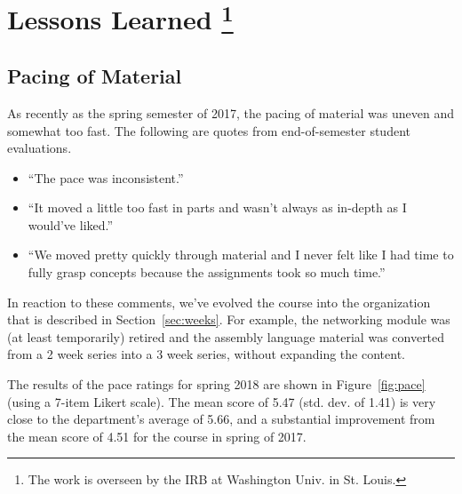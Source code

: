 \section{Lessons Learned%
\protect\footnote{The work is overseen by the IRB at Washington Univ. in St. Louis.}
}
\label{sec:lessons}


\subsection{Pacing of Material}


As recently as the spring semester of 2017, the pacing of material
was uneven and somewhat too fast.  The following are quotes from
end-of-semester student evaluations.
\begin{itemize}
\item ``The pace was inconsistent.''
\item ``It moved a little too fast in parts and wasn't always as
in-depth as I would've liked.''
\item ``We moved pretty quickly through material and I never felt like I had
time to fully grasp concepts because the assignments took so much time.''
\end{itemize}
In reaction to these comments, we've evolved the course into the organization
that is described in Section~\ref{sec:weeks}.
For example, the networking module was (at least temporarily) retired
and the assembly language material was converted from a
2 week series into a 3 week series, without expanding the content.

The results of the pace ratings for spring 2018 are shown in
Figure~\ref{fig:pace} (using a 7-item Likert scale).
The mean score of 5.47 (std. dev. of 1.41)
is very close to the department's average of
5.66, and a substantial improvement from the mean score of 4.51
for the course in spring of 2017.

